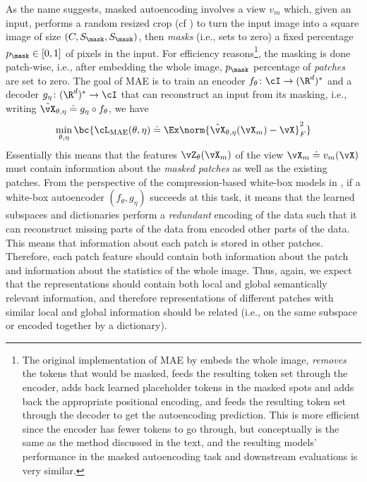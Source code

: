 \documentclass[../../book-main.tex]{subfiles}
\begin{document}
As the name suggests, masked autoencoding involves a view \(v_{m}\) which, given an input, performs a random resized crop (cf ) to turn the input image into a square image of size \((C, S_{\mask}, S_{\mask})\), then \textit{masks} (i.e., sets to zero) a fixed percentage \(p_{\mask} \in [0, 1]\) of pixels in the input. For efficiency reasons\footnote{The original implementation of MAE by \cite{he2022masked} embeds the whole image, \textit{removes} the tokens that would be masked, feeds the resulting token set through the encoder, adds back learned placeholder tokens in the masked spots and adds back the appropriate positional encoding, and feeds the resulting token set through the decoder to get the autoencoding prediction. This is more efficient since the encoder has fewer tokens to go through, but conceptually is the same as the method discussed in the text, and the resulting models' performance in the masked autoencoding task and downstream evaluations is very similar.}, the masking is done patch-wise, i.e.,  after embedding the whole image, \(p_{\mask}\) percentage of \textit{patches} are set to zero. The goal of MAE is to train an encoder \(f_{\theta} \colon \cI \to (\R^{d})^{*}\) and a decoder \(g_{\eta} \colon (\R^{d})^{*} \to \cI\) that can reconstruct an input from its masking, i.e., writing \(\hat{\vX}_{\theta, \eta} \doteq g_{\eta} \circ f_{\theta}\), we have
\begin{equation}
    \min_{\theta, \eta}\bc{\cL_{\mathrm{MAE}}(\theta, \eta) \doteq \Ex\norm{\hat{\vX}_{\theta, \eta}(\vX_{m}) - \vX}_{F}^{2}}
\end{equation}
Essentially this means that the features \(\vZ_{\theta}(\vX_{m})\) of the view \(\vX_{m} \doteq v_{m}(\vX)\) must contain information about the \textit{masked patches} as well as the existing patches. From the perspective of the compression-based white-box models in , if a white-box autoencoder  \((f_{\theta}, g_{\eta})\) succeeds at this task, it means that the learned subspaces and dictionaries perform a \textit{redundant} encoding of the data such that it can reconstruct missing parts of the data from encoded other parts of the data. This means that information about each patch is stored in other patches. Therefore, each patch feature should contain both information about the patch and information about the statistics of the whole image. Thus, again, we expect that the representations should contain both local and global semantically relevant information, and therefore representations of different patches with similar local and global information should be related (i.e., on the same subspace or encoded together by a dictionary).
\end{document}
